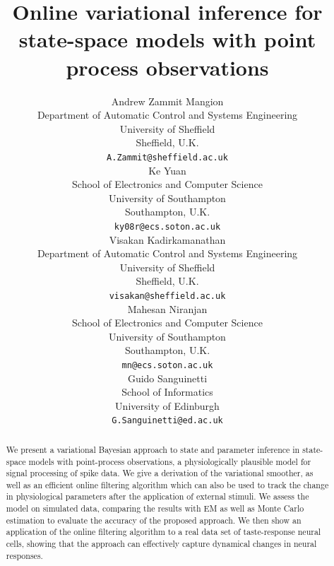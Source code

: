 \documentclass{article}
\title{Online variational inference for state-space models with point process observations}
\begin{document}
\author{
Andrew Zammit Mangion \\
Department of Automatic Control and Systems Engineering\\
University of Sheffield\\
Sheffield, U.K. \\
\texttt{A.Zammit@sheffield.ac.uk} \\
\And
Ke Yuan\\
School of Electronics and Computer Science\\
University of Southampton\\
Southampton, U.K.\\
\texttt{ky08r@ecs.soton.ac.uk} \\
\AND
Visakan Kadirkamanathan\\
Department of Automatic Control and Systems Engineering\\
University of Sheffield\\
Sheffield, U.K. \\
\texttt{visakan@sheffield.ac.uk} \\
\And
Mahesan Niranjan\\
School of Electronics and Computer Science\\
University of Southampton\\
Southampton, U.K.\\
\texttt{mn@ecs.soton.ac.uk} \\
\And
Guido Sanguinetti\\
School of Informatics\\
University of Edinburgh\\
\texttt{G.Sanguinetti@ed.ac.uk}
}

\maketitle
\begin{abstract} We present a variational Bayesian approach to state and parameter inference in
	state-space models with point-process observations, a physiologically plausible model for
	signal processing of spike data. We give a derivation of the variational smoother, as well
	as an efficient online filtering algorithm which can also be used to track the change in
	physiological parameters after the application of external stimuli. We assess the model on
	simulated data, comparing the results with EM as well as Monte Carlo estimation to evaluate
	the accuracy of the proposed approach. We then show an application of the online filtering
	algorithm to a real data set of taste-response neural cells, showing that the approach can
	effectively capture dynamical changes in neural responses.  \end{abstract}
\end{document}
